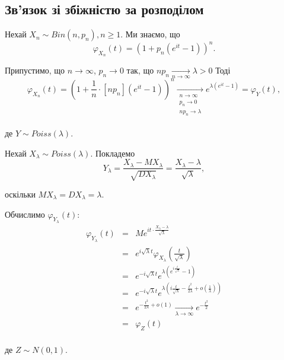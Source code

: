 \subsection{Зв'язок зі збіжністю за розподілом}

\begin{example}
    Нехай  $X_n \sim Bin(n, p_n), n \geqslant 1$.
    Ми знаємо, що
    $$\varphi_{X_n}(t) = (1 + p_n(e^{it}-1))^n.$$

    Припустимо, що $n \rightarrow \infty$, $p_n \rightarrow 0$ так,
    що $np_n \xrightarrow[n \rightarrow \infty]{} \lambda > 0$
    Тоді
    $$\varphi_{X_n}(t)
    = (1 + \frac{1}{n} \cdot [n p_n](e^{it}-1))^n \xrightarrow[ \begin{array}{c}
            n \rightarrow \infty \\
            p_n \rightarrow 0 \\
            np_n \rightarrow \lambda \\
        \end{array} ]{} e^{\lambda(e^{it} - 1)}
    = \varphi_{Y}(t),$$

    де $Y \sim Poiss(\lambda).$
\end{example}

\begin{example}
    Нехай $X_{\lambda} \sim Poiss(\lambda)$.
    Покладемо
    $$Y_{\lambda}
    = \dfrac{X_{\lambda} - MX_{\lambda}}{\sqrt{DX_{\lambda}}}
    = \dfrac{X_{\lambda} - \lambda}{\sqrt{\lambda}},$$

    оскільки $MX_{\lambda} = DX_{\lambda} = \lambda.$

    Обчислимо $\varphi_{Y_{\lambda}}(t)$:
    $$\begin{array}{rcl}
        \varphi_{Y_{\lambda}}(t) 
        & = & Me^{it \cdot \frac{X_{\lambda} - \lambda}{\sqrt{\lambda}}} \\
        & = & e^{i \sqrt{\lambda} t} \varphi_{X_{\lambda}}(\frac{t}{\sqrt{\lambda}}) \\
        & = & e^{-i \sqrt{\lambda} t} e^{\lambda(e^{i\frac{t}{\sqrt{\lambda}}} - 1)} \\
        & = & e^{-i \sqrt{\lambda} t}
            e^{\lambda(i \frac{t}{\sqrt{\lambda}} - \frac{t^2}{2\lambda} + o(\frac{1}{\lambda}))} \\
        & = & e^{-\frac{t^2}{2\lambda} + o(1)} \xrightarrow[\lambda \rightarrow \infty]{} e^{-\frac{t^2}{2}} \\
        & = & \varphi_{Z}(t) \\
    \end{array}$$
    
    де $Z \sim N(0, 1)$.
\end{example}

